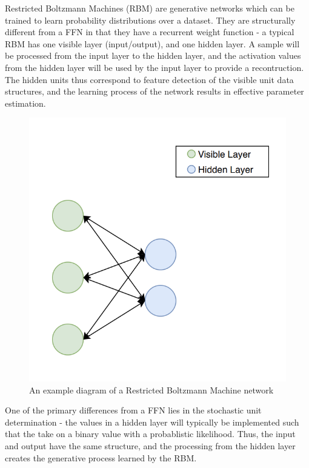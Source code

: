 \documentclass[a4paper,11pt,oneside]{article}
\theoremstyle{plain}
\theoremstyle{definition}
\begin{document}
Restricted Boltzmann Machines (RBM) are generative networks which can be trained to learn probability distributions over a dataset. They are structurally different from a FFN in that they have a recurrent weight function - a typical RBM has one visible layer (input/output), and one hidden layer. A sample will be processed from the input layer to the hidden layer, and the activation values from the hidden layer will be used by the input layer to provide a recontruction. The hidden units thus correspond to feature detection of the visible unit data structures, and the learning process of the network results in effective parameter estimation. \newline

\begin{figure}[H]
	\centering 
	\includegraphics[scale=0.5]{images/implementation/rbm_network_diagram.png}
	\caption[Restricted Boltzmann Machines Diagram]{An example diagram of a Restricted Boltzmann Machine network}
	\label{figure-rbm_network_diagram}
\end{figure}		

One of the primary differences from a FFN lies in the stochastic unit determination - the values in a hidden layer will typically be implemented such that the take on a binary value with a probablistic likelihood. Thus, the input and output have the same structure, and the processing from the hidden layer creates the generative process learned by the RBM. \newline
\end{document}
